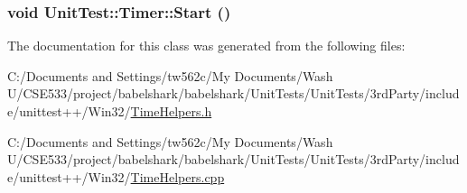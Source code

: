 \hypertarget{class_unit_test_1_1_timer_cb9c2831775e37497e40f3df652eb9d9}{
\subsubsection[{Start}]{\setlength{\rightskip}{0pt plus 5cm}void UnitTest::Timer::Start ()}}
\label{class_unit_test_1_1_timer_cb9c2831775e37497e40f3df652eb9d9}




The documentation for this class was generated from the following files:\begin{CompactItemize}
\item 
C:/Documents and Settings/tw562c/My Documents/Wash U/CSE533/project/babelshark/babelshark/UnitTests/UnitTests/3rdParty/include/unittest++/Win32/\hyperlink{_win32_2_time_helpers_8h}{TimeHelpers.h}\item 
C:/Documents and Settings/tw562c/My Documents/Wash U/CSE533/project/babelshark/babelshark/UnitTests/UnitTests/3rdParty/include/unittest++/Win32/\hyperlink{_time_helpers_8cpp}{TimeHelpers.cpp}\end{CompactItemize}
